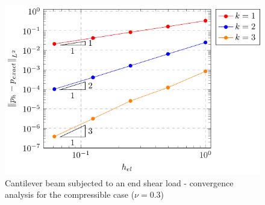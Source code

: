 \documentclass{wccm2024}
\begin{document}
\begin{figure}
     \hfill
    \includegraphics[trim={8.5cm 0cm 0cm 0cm},clip,scale=0.75]{figs/bishop-pres-03.pdf}
    \caption{Cantilever beam subjected to an end shear load - convergence analysis for the compressible case ($\nu=0.3$)}
    \label{fig:bishop-convergence-nu-03}
\end{figure}
\end{document}
